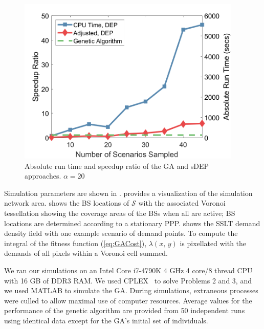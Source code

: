 \documentclass[conference]{IEEEtran}
\begin{document}
\begin{figure}[t]
\begin{minipage}{0.64\textwidth}
		\label{fig:NetworkArea}
	\end{minipage} \hfill
	\begin{minipage}{0.32\textwidth}
		\centering
		\includegraphics[width=0.95\textwidth]{Figures/VOSGA_SpeedupRatio_AbsComp_alpha20}
		\caption{\small Absolute run time and speedup ratio of the GA and sDEP approaches. $\alpha = 20$}
		\label{fig:AlgSpeedupRunTime}
	\end{minipage}
\end{figure}

Simulation parameters are shown in .   provides a visualization of the simulation network area.   shows the BS locations of $\mathcal{S}$ with the associated Voronoi tessellation showing the coverage areas of the BSs when all are active; BS locations are determined according to a stationary PPP.   shows the SSLT demand density field with one example scenario of demand points.  To compute the integral of the fitness function (\cref{eq:GACost}), $\lambda\left( x,\, y \right)$ is pixellated with the demands of all pixels within a Voronoi cell summed.

We ran our simulations on an Intel Core i7-4790K 4 GHz 4 core/8 thread CPU with 16 GB of DDR3 RAM.  We used CPLEX~\cite{Cplex} to solve Problems 2 and 3, and we used MATLAB to simulate the GA.  During simulations, extraneous processes were culled to allow maximal use of computer resources.  Average values for the performance of the genetic algorithm are provided from 50 independent runs using identical data except for the GA's initial set of individuals.
\end{document}
